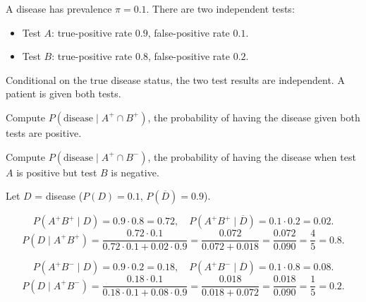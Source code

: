 \documentclass[test,letterpaper]{cs20}
\begin{document}
\begin{problem}

A disease has prevalence $\pi = 0.1$. There are two independent tests:
\begin{itemize}
\item Test $A$: true-positive rate $0.9$, false-positive rate $0.1$.
\item Test $B$: true-positive rate $0.8$, false-positive rate $0.2$.
\end{itemize}
Conditional on the true disease status, the two test results are independent. A patient is given both tests.

\subproblem Compute $P(\text{disease} \mid A^+ \cap B^+)$, the probability of having the disease given both tests are positive.

\subproblem Compute $P(\text{disease} \mid A^+ \cap B^-)$, the probability of having the disease when test $A$ is positive but test $B$ is negative.

\begin{solution}
Let $D$ = disease ($P(D) = 0.1$, $P(\overline{D}) = 0.9$).

\subsolution
\[
P(A^+ B^+ \mid D) = 0.9\cdot 0.8 = 0.72,\quad P(A^+ B^+ \mid \overline{D}) = 0.1\cdot 0.2 = 0.02.
\]
\[
P(D \mid A^+ B^+) = \frac{0.72\cdot 0.1}{0.72\cdot 0.1 + 0.02\cdot 0.9} = \frac{0.072}{0.072 + 0.018} = \frac{0.072}{0.090} = \frac{4}{5} = 0.8.
\]

\subsolution
\[
P(A^+ B^- \mid D) = 0.9\cdot 0.2 = 0.18,\quad P(A^+ B^- \mid \overline{D}) = 0.1\cdot 0.8 = 0.08.
\]
\[
P(D \mid A^+ B^-) = \frac{0.18\cdot 0.1}{0.18\cdot 0.1 + 0.08\cdot 0.9} = \frac{0.018}{0.018 + 0.072} = \frac{0.018}{0.090} = \frac{1}{5} = 0.2.
\]
\end{solution}

\pagebreak

\end{problem}
\end{document}
